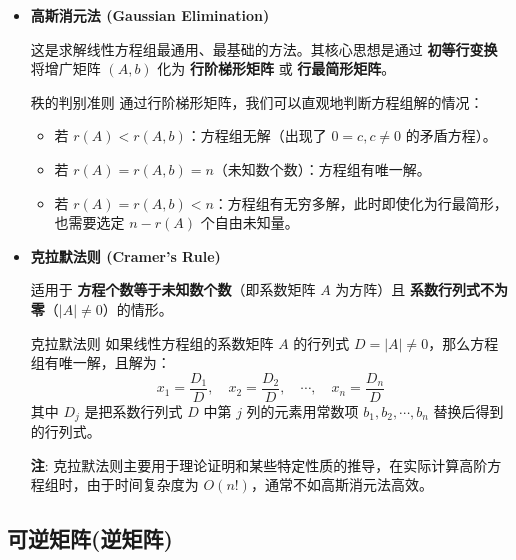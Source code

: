 \documentclass[a4paper,12pt]{ctexart}
\begin{document}
    \begin{itemize}
        \item \textbf{高斯消元法 (Gaussian Elimination)}
        
        这是求解线性方程组最通用、最基础的方法。其核心思想是通过 \textbf{初等行变换} 将增广矩阵 $(A, b)$ 化为 \textbf{行阶梯形矩阵} 或 \textbf{行最简形矩阵}。
        
        \begin{mythm}{秩的判别准则}{}
        通过行阶梯形矩阵，我们可以直观地判断方程组解的情况：
        \begin{itemize}
            \item 若 $r(A) < r(A, b)$：方程组无解（出现了 $0 = c, c\neq0$ 的矛盾方程）。
            \item 若 $r(A) = r(A, b) = n$（未知数个数）：方程组有唯一解。
            \item 若 $r(A) = r(A, b) < n$：方程组有无穷多解，此时即使化为行最简形，也需要选定 $n-r(A)$ 个自由未知量。
        \end{itemize}
        \end{mythm}
        
        \item \textbf{克拉默法则 (Cramer's Rule)}
        
        适用于 \textbf{方程个数等于未知数个数}（即系数矩阵 $A$ 为方阵）且 \textbf{系数行列式不为零}（$|A| \neq 0$）的情形。
        
        \begin{mythm}{克拉默法则}{}
        如果线性方程组的系数矩阵 $A$ 的行列式 $D = |A| \neq 0$，那么方程组有唯一解，且解为：
        \[
        x_1 = \frac{D_1}{D}, \quad x_2 = \frac{D_2}{D}, \quad \cdots, \quad x_n = \frac{D_n}{D}
        \]
        其中 $D_j$ 是把系数行列式 $D$ 中第 $j$ 列的元素用常数项 $b_1, b_2, \cdots, b_n$ 替换后得到的行列式。
        \end{mythm}
        
        \begin{mynote}
        \textbf{注}: 克拉默法则主要用于理论证明和某些特定性质的推导，在实际计算高阶方程组时，由于时间复杂度为 $O(n!)$，通常不如高斯消元法高效。
        \end{mynote}
    \end{itemize}

\subsection{可逆矩阵(逆矩阵)}
\end{document}
